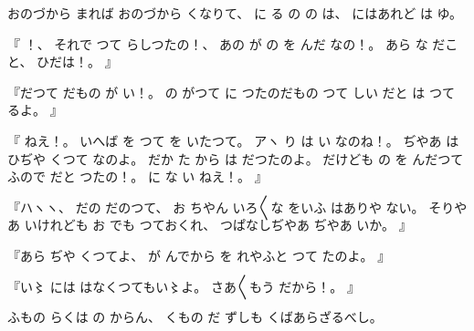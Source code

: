 %
おのづから
まれば
おのづから
くなりて、
%
に
る
の
の
は、
%
にはあれど
は
ゆ。

%
『
！、
%
それで
つて
らしつたの！、
%
あの
が
の
を
んだ
なの！。
%
あら
な
だこと、
%
ひだは！。
』

%
『だつて
だもの
が
い！。
%
の
がつて
に
つたのだもの
つて
しい
だと
は
つて
るよ。
』

%
『
ねえ！。
%
いへば
を
つて
を
いたつて。
%
アヽ
り
は
い
なのね！。
%
ぢやあ
は
ひぢや
くつて
なのよ。
%
だか
た
から
は
だつたのよ。
%
だけども
の
を
んだつて
ふので
だと
つたの！。
%
に
な
い
ねえ！。
』

%
『ハヽヽ、
%
だの
だのつて、
%
お
ちやん
いろ〳〵な
をいふ
はありや
ない。
%
そりやあ
いけれども
お
でも
つておくれ、
%
つぱなしぢやあ
ぢやあ
いか。
』

%
『あら
ぢや
くつてよ、
%
が
んでから
を
れやふと
つて
たのよ。
』

%
『い〻
には
はなくつてもい〻よ。
%
さあ〳〵もう
だから！。
』

%
ふもの
らくは
の
からん、
%
くもの
だ
ずしも
くばあらざるべし。

